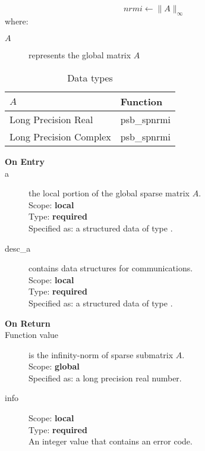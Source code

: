 \[ nrmi \leftarrow \|A\|_\infty \]
where:
\begin{description}
\item[$A$] represents the global matrix $A$
\end{description}

\begin{table}[h]
\begin{center}
\begin{tabular}{ll}
\hline
$A$ & {\bf Function}\\
\hline
Long Precision Real & psb\_spnrmi \\
Long Precision Complex & psb\_spnrmi \\
\hline
\end{tabular}
\end{center}
\caption{Data types\label{tab:f90nrmi}}
\end{table}


\begin{description}
\item[\bf On Entry]
\item[a] the local  portion of the global sparse matrix
$A$. \\   
Scope: {\bf local} \\
Type: {\bf required}\\
Specified as: a structured data of type \spdata.
\item[desc\_a] contains data structures for communications.\\
Scope: {\bf local} \\
Type: {\bf required}\\
Specified as: a structured data of type \descdata.
\item[\bf On Return] 
\item[Function value] is the infinity-norm of sparse submatrix $A$.\\
Scope: {\bf global} \\
Specified as: a long precision real number.
\item[info] 
Scope: {\bf local} \\
Type: {\bf required} \\
An integer value that contains an error code. 
\end{description}


%
%


